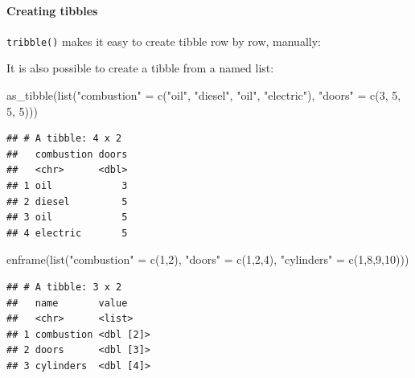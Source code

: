 \documentclass[
]{article}
\newenvironment{Shaded}{\begin{snugshade}}{\end{snugshade}}
\newcommand{\DecValTok}[1]{\textcolor[rgb]{0.00,0.00,0.81}{#1}}
\newcommand{\FunctionTok}[1]{\textcolor[rgb]{0.00,0.00,0.00}{#1}}
\newcommand{\NormalTok}[1]{#1}
\newcommand{\OtherTok}[1]{\textcolor[rgb]{0.56,0.35,0.01}{#1}}
\newcommand{\StringTok}[1]{\textcolor[rgb]{0.31,0.60,0.02}{#1}}
\begin{document}
\hypertarget{creating-tibbles}{%
\paragraph{Creating tibbles}\label{creating-tibbles}}

\texttt{tribble()} makes it easy to create tibble row by row, manually:

It is also possible to create a tibble from a named list:

\begin{Shaded}
\begin{Highlighting}[]
\FunctionTok{as\_tibble}\NormalTok{(}\FunctionTok{list}\NormalTok{(}\StringTok{"combustion"} \OtherTok{=} \FunctionTok{c}\NormalTok{(}\StringTok{"oil"}\NormalTok{, }\StringTok{"diesel"}\NormalTok{, }\StringTok{"oil"}\NormalTok{, }\StringTok{"electric"}\NormalTok{),}
               \StringTok{"doors"} \OtherTok{=} \FunctionTok{c}\NormalTok{(}\DecValTok{3}\NormalTok{, }\DecValTok{5}\NormalTok{, }\DecValTok{5}\NormalTok{, }\DecValTok{5}\NormalTok{)))}
\end{Highlighting}
\end{Shaded}

\begin{verbatim}
## # A tibble: 4 x 2
##   combustion doors
##   <chr>      <dbl>
## 1 oil            3
## 2 diesel         5
## 3 oil            5
## 4 electric       5
\end{verbatim}

\begin{Shaded}
\begin{Highlighting}[]
\FunctionTok{enframe}\NormalTok{(}\FunctionTok{list}\NormalTok{(}\StringTok{"combustion"} \OtherTok{=} \FunctionTok{c}\NormalTok{(}\DecValTok{1}\NormalTok{,}\DecValTok{2}\NormalTok{), }\StringTok{"doors"} \OtherTok{=} \FunctionTok{c}\NormalTok{(}\DecValTok{1}\NormalTok{,}\DecValTok{2}\NormalTok{,}\DecValTok{4}\NormalTok{), }\StringTok{"cylinders"} \OtherTok{=} \FunctionTok{c}\NormalTok{(}\DecValTok{1}\NormalTok{,}\DecValTok{8}\NormalTok{,}\DecValTok{9}\NormalTok{,}\DecValTok{10}\NormalTok{)))}
\end{Highlighting}
\end{Shaded}

\begin{verbatim}
## # A tibble: 3 x 2
##   name       value    
##   <chr>      <list>   
## 1 combustion <dbl [2]>
## 2 doors      <dbl [3]>
## 3 cylinders  <dbl [4]>
\end{verbatim}
\end{document}
